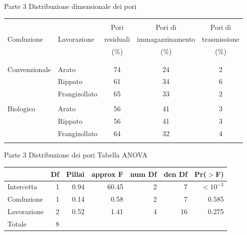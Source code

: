 \documentclass[xcolor={usenames, table, x11names}, final, 10pt]{beamer}
\begin{document}
\begin{frame}{Parte 3 \small{Distribuzione dimensionale dei pori}}

  \footnotesize
  \begin{table}[hb]
    \centering
    \begin{tabular}{llccc}%
      
      \toprule
      \\
   &             & Pori    & Pori di         & Pori di\\
      Conduzione & Lavorazione & residuali & immagazzinamento &
                                                                trasmissione \\ 
   &             & (\%) &  (\%) &  (\%) \\
      \\
      \midrule
      \\
      Convenzionale & Arato & 74 & 24 & 2 \\ 
   & Rippato & 61 & 34 & 6 \\ 
   & Frangizollato & 65 & 33 & 2 \\ 
   &  &  &  &  \\ 
      Biologico & Arato & 56 & 41 & 3 \\ 
   & Rippato & 56 & 41 & 3 \\ 
   & Frangizollato & 64 & 32 & 4 \\ 
      \\
      \bottomrule
    \end{tabular}
  \end{table}
\end{frame}

\begin{frame}{Parte 3 \small{Distribuzione dei pori}}
  Tabella ANOVA 
  \begin{table}[ht]
    \centering
    \begin{tabular}{lrrrrrr}
      \toprule
      & Df & Pillai & approx F & num Df & den Df & Pr($>$F) \\ 
      \midrule
      Intercetta & 1 & 0.94 & 60.45 & 2 & 7 & $<10^{-3}$ \\ 
      Conduzione & 1 & 0.14 & 0.58 & 2 & 7 & 0.585 \\ 
      Lavorazione & 2 & 0.52 & 1.41 & 4 & 16 & 0.275 \\ 
      Totale & 8 &  &  &  &  &  \\ 
      \bottomrule
    \end{tabular}
  \end{table}
\end{frame}
\end{document}
